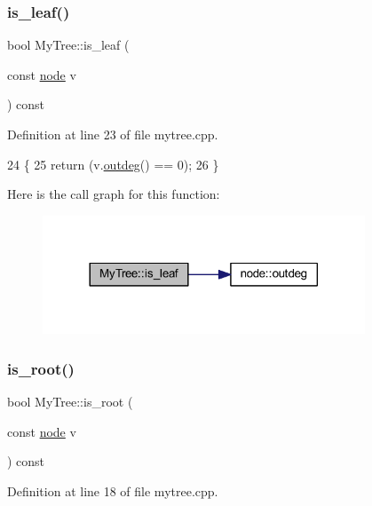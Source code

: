\subsubsection{\texorpdfstring{is\+\_\+leaf()}{is\_leaf()}}
{\footnotesize\ttfamily bool My\+Tree\+::is\+\_\+leaf (\begin{DoxyParamCaption}\item[{const \mbox{\hyperlink{classnode}{node}}}]{v }\end{DoxyParamCaption}) const}



Definition at line 23 of file mytree.\+cpp.


\begin{DoxyCode}
24 \{
25     \textcolor{keywordflow}{return} (v.\mbox{\hyperlink{classnode_a32adc45c4132e2642ccd2233d79ffe67}{outdeg}}() == 0);
26 \}
\end{DoxyCode}
Here is the call graph for this function\+:\nopagebreak
\begin{figure}[H]
\begin{center}
\leavevmode
\includegraphics[width=272pt]{class_my_tree_af4cde35ddb02e57b451d34e83d9cc626_cgraph}
\end{center}
\end{figure}
\mbox{\label{class_my_tree_a2590ac659aafc07741ee8bb28b457f54}} 
\subsubsection{\texorpdfstring{is\+\_\+root()}{is\_root()}}
{\footnotesize\ttfamily bool My\+Tree\+::is\+\_\+root (\begin{DoxyParamCaption}\item[{const \mbox{\hyperlink{classnode}{node}}}]{v }\end{DoxyParamCaption}) const}



Definition at line 18 of file mytree.\+cpp.


